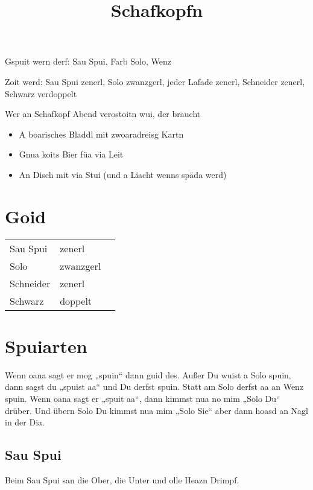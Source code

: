 \documentclass[11pt,a4paper]{scrartcl}		%
\title{Schafkopfn}
\makeatletter
\def\maketitle{
	\begin{center}
		\textbf{\huge \@title}
	\end{center}
}
\makeatother
\begin{document}

	\maketitle



	Gspuit wern derf: Sau Spui, Farb Solo, Wenz

	Zoit werd: Sau Spui zenerl, Solo zwanzgerl, jeder Lafade zenerl, Schneider zenerl, Schwarz verdoppelt



	
	Wer an Schafkopf Abend verostoitn wui, der braucht
	\begin{itemize}
		\item A boarisches Bladdl mit zwoaradreisg Kartn
		\item Gnua koits Bier füa via Leit
		\item An Disch mit via Stui (und a Liacht wenns späda werd)
	\end{itemize}


	\section{Goid}

	\begin{tabular}{lll}
		Sau Spui & zenerl \\
		Solo & zwanzgerl \\
		Schneider & zenerl \\
		Schwarz & doppelt \\ 
	\end{tabular}	


	\section{Spuiarten}
	Wenn oana sagt er mog „spuin“ dann guid des. Außer Du wuist a Solo spuin, dann sagst du „spuist aa“ und Du derfst spuin. Statt am Solo derfst aa an Wenz spuin. Wenn oana sagt er „spuit aa“, dann kimmst nua no mim „Solo Du“ drüber. Und übern Solo Du kimmst nua mim „Solo Sie“ aber dann hoasd an Nagl in der Dia.


		\subsection{Sau Spui}
		Beim Sau Spui san die Ober, die Unter und olle Heazn Drimpf.
\end{document}
